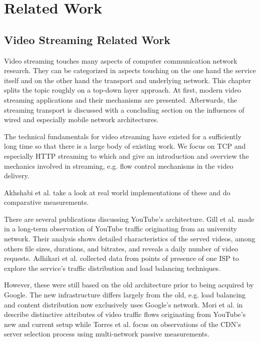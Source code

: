 \section{Related Work}

\subsection{Video Streaming Related Work}

Video streaming touches many aspects of computer communication network research. They can be categorized in aspects touching on the one hand the service itself and on the other hand  the transport and underlying network. This chapter splits the topic roughly on a top-down layer approach. At first, modern video streaming applications and their mechanisms are presented. Afterwards, the streaming transport is discussed with a concluding section on the influences of wired and especially mobile network architectures.


The technical fundamentals for video streaming have existed for a sufficiently long time so that there is a large body of existing work. We focus on TCP and especially HTTP streaming to which \cite{watching-video1} and \cite{ma2011mobile} give an introduction and overview the mechanics involved in streaming, e.g. flow control mechanisms in the video delivery.

Akhshabi et al. \cite{akhshabi2011experimental} take a look at real world implementations of these and do comparative measurements.

There are several publications discussing YouTube's architecture. Gill et al. made in \cite{gill2007youtube} a long-term observation of YouTube traffic originating from an university network. Their analysis shows detailed characteristics of the served videos, among others file sizes, durations, and bitrates, and reveals a daily number of video requests. Adhikari et al. \cite{adhikari2010youtube} collected data from points of presence of one ISP to explore the service's traffic distribution and load balancing techniques.

However, these were still based on the old architecture prior to being acquired by Google. The new infrastructure differs largely from the old, e.g. load balancing and content distribution now exclusively uses Google’s network. Mori et al. in \cite{mori2010characterizing} describe distinctive attributes of video traffic flows originating from YouTube's new and current setup while Torres et al. \cite{torres2011dissecting} focus on observations of the CDN's server selection process using multi-network passive measurements.


